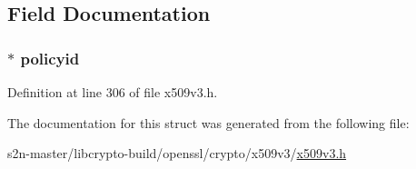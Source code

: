 \subsection{Field Documentation}
\subsubsection[{\texorpdfstring{policyid}{policyid}}]{ $\ast$ policyid}\hypertarget{struct_p_o_l_i_c_y_i_n_f_o__st_a3a32ff8d397b93a35f606e3ca8ced90d}{}\label{struct_p_o_l_i_c_y_i_n_f_o__st_a3a32ff8d397b93a35f606e3ca8ced90d}


Definition at line 306 of file x509v3.\+h.



The documentation for this struct was generated from the following file\+:\begin{DoxyCompactItemize}
\item 
s2n-\/master/libcrypto-\/build/openssl/crypto/x509v3/\hyperlink{crypto_2x509v3_2x509v3_8h}{x509v3.\+h}\end{DoxyCompactItemize}
